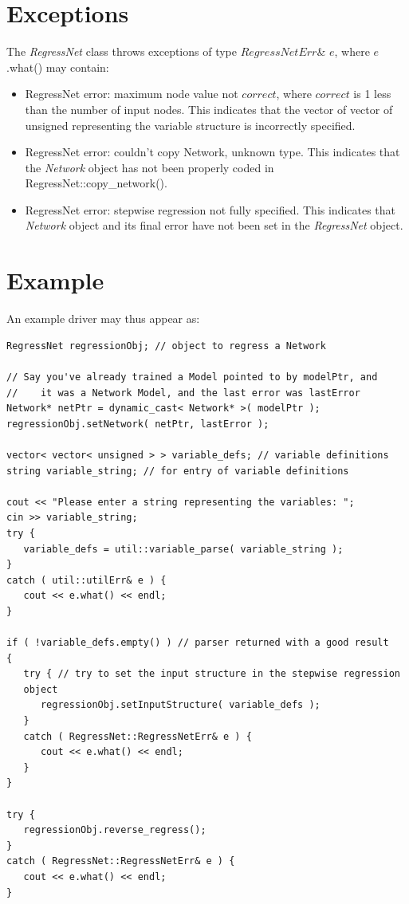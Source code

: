 \documentclass{report}
\begin{document}
\section{Exceptions}

The {\em RegressNet} class throws exceptions of type $RegressNetErr$\&
$e$, where $e$.what() may contain:

\begin{itemize}
\item RegressNet error: maximum node value not $correct$, where
      $correct$ is 1 less than the number of input nodes.  This
      indicates that the vector of vector of unsigned representing the
      variable structure is incorrectly specified.
\item RegressNet error: couldn't copy Network, unknown type.  This
      indicates that the {\em Network} object has not been properly
      coded in RegressNet::copy\_network().
\item RegressNet error: stepwise regression not fully specified.  This
      indicates that {\em Network} object and its final error have not
      been set in the {\em RegressNet} object.
\end{itemize}

\section{Example}

An example driver may thus appear as:

\begin{verbatim}
RegressNet regressionObj; // object to regress a Network

// Say you've already trained a Model pointed to by modelPtr, and
//    it was a Network Model, and the last error was lastError
Network* netPtr = dynamic_cast< Network* >( modelPtr );
regressionObj.setNetwork( netPtr, lastError );

vector< vector< unsigned > > variable_defs; // variable definitions
string variable_string; // for entry of variable definitions

cout << "Please enter a string representing the variables: ";
cin >> variable_string;
try {
   variable_defs = util::variable_parse( variable_string );
}
catch ( util::utilErr& e ) {
   cout << e.what() << endl;
}

if ( !variable_defs.empty() ) // parser returned with a good result
{
   try { // try to set the input structure in the stepwise regression
   object
      regressionObj.setInputStructure( variable_defs );
   }
   catch ( RegressNet::RegressNetErr& e ) {
      cout << e.what() << endl;
   }
}

try {
   regressionObj.reverse_regress();
}
catch ( RegressNet::RegressNetErr& e ) {
   cout << e.what() << endl;
}
\end{verbatim}
\end{document}
